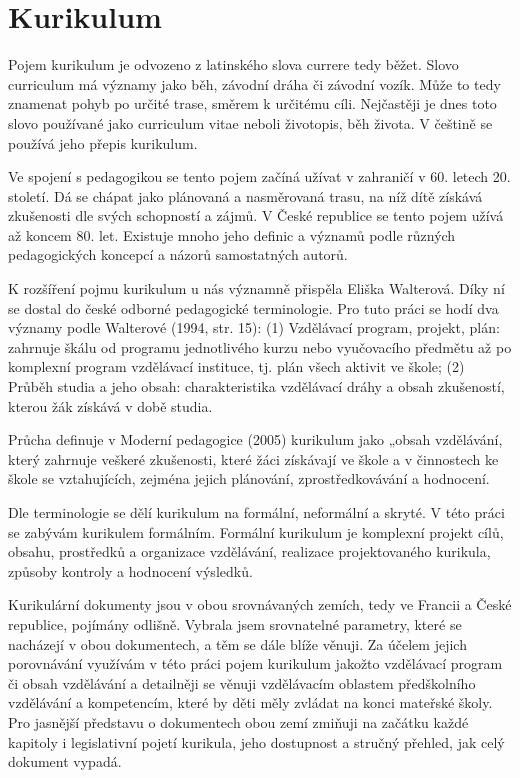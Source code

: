 \chapter{Kurikulum}
\label{}

Pojem kurikulum je odvozeno z latinského slova currere tedy běžet. Slovo curriculum má významy jako běh, závodní dráha či závodní vozík. Může to tedy znamenat pohyb po určité trase, směrem k určitému cíli. Nejčastěji je dnes toto slovo používané jako curriculum vitae neboli životopis, běh života. V češtině se používá jeho přepis kurikulum. 

\vspace{5mm} %
Ve spojení s pedagogikou se tento pojem začíná užívat v zahraničí v 60. letech 20. století. Dá se chápat jako plánovaná a nasměrovaná trasu, na níž dítě získává zkušenosti dle svých schopností a zájmů. V České republice se tento pojem užívá až koncem 80. let. Existuje mnoho jeho definic a významů podle různých pedagogických koncepcí a názorů samostatných autorů.

K rozšíření pojmu kurikulum u nás významně přispěla Eliška Walterová. Díky ní se dostal do české odborné pedagogické terminologie. Pro tuto práci se hodí dva významy podle Walterové (1994, str. 15): (1) Vzdělávací program, projekt, plán: zahrnuje škálu od programu jednotlivého kurzu nebo vyučovacího předmětu až po komplexní program vzdělávací instituce, tj. plán všech aktivit ve škole;
(2) Průběh studia a jeho obsah: charakteristika vzdělávací dráhy a obsah zkušeností, kterou žák získává v době studia.

Průcha definuje v Moderní pedagogice (2005) kurikulum jako „obsah vzdělávání, který zahrnuje veškeré zkušenosti, které žáci získávají ve škole a v činnostech ke škole se vztahujících, zejména jejich plánování, zprostředkovávání a hodnocení.

Dle terminologie se dělí kurikulum na formální, neformální a skryté. V této práci se zabývám kurikulem formálním. Formální kurikulum je komplexní projekt cílů, obsahu, prostředků a organizace vzdělávání, realizace projektovaného kurikula, způsoby kontroly a hodnocení výsledků.

Kurikulární dokumenty jsou v obou srovnávaných zemích, tedy ve Francii a České republice, pojímány odlišně. Vybrala jsem srovnatelné parametry, které se nacházejí v obou dokumentech, a těm se dále blíže věnuji. Za účelem jejich porovnávání využívám v této práci pojem kurikulum jakožto vzdělávací program či obsah vzdělávání a detailněji se věnuji vzdělávacím oblastem předškolního vzdělávání a kompetencím, které by děti měly zvládat na konci mateřské školy. Pro jasnější představu o dokumentech obou zemí zmiňuji na začátku každé kapitoly i legislativní pojetí kurikula, jeho dostupnost a stručný přehled, jak celý dokument vypadá. 

